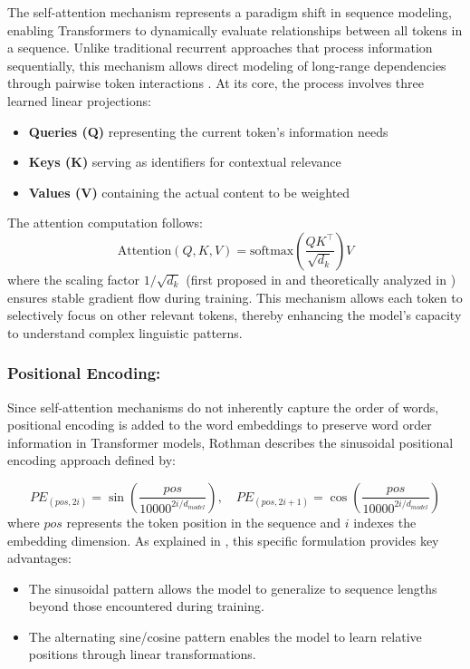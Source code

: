 The self-attention mechanism represents a paradigm shift in sequence modeling, enabling Transformers to dynamically evaluate relationships between all tokens in a sequence. Unlike traditional recurrent approaches that process information sequentially, this mechanism allows direct modeling of long-range dependencies through pairwise token interactions \citep{choromanski2020rethinking}. At its core, the process involves three learned linear projections:
\begin{itemize}
	\item \textbf{Queries (Q)} representing the current token's information needs
	\item \textbf{Keys (K)} serving as identifiers for contextual relevance
	\item \textbf{Values (V)} containing the actual content to be weighted
\end{itemize}
The attention computation follows:
\begin{equation}
	\text{Attention}(Q,K,V) = \text{softmax}\left(\frac{QK^\top}{\sqrt{d_k}}\right)V
\end{equation}
where the scaling factor $1/\sqrt{d_k}$ (first proposed in \citep{vaswani2017attention} and theoretically analyzed in \citep{choromanski2020rethinking}) ensures stable gradient flow during training. 
This mechanism allows each token to selectively focus on other relevant tokens, thereby enhancing the model’s capacity to understand complex linguistic patterns.
\subsubsection{Positional Encoding:}
Since self-attention mechanisms do not inherently capture the order of words, positional encoding is added to the word embeddings to preserve word order information in Transformer models, Rothman \citep{rothman2021transformers} describes the sinusoidal positional encoding approach defined by:

\begin{equation}
	PE_{(pos,2i)} = \sin\left(\frac{pos}{10000^{2i/d_{model}}}\right), \quad 
	PE_{(pos,2i+1)} = \cos\left(\frac{pos}{10000^{2i/d_{model}}}\right)
\end{equation}
where $pos$ represents the token position in the sequence and $i$ indexes the embedding dimension. As explained in \citep{rothman2021transformers}, this specific formulation provides key advantages:

\begin{itemize}
	\item The sinusoidal pattern allows the model to generalize to sequence lengths beyond those encountered during training.
	\item The alternating sine/cosine pattern enables the model to learn relative positions through linear transformations.
\end{itemize}
